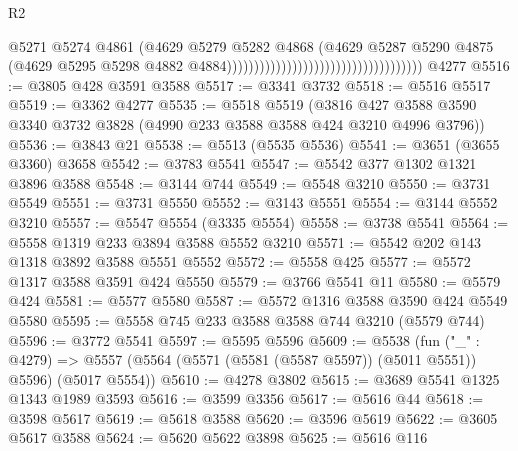 \begin{lexlean}{R2}
\begin{coremodule}
                                                                      @5271
                                                                      @5274
                                                                      @4861
                                                                      (@4629
                                                                        @5279
                                                                        @5282
                                                                        @4868
                                                                        (@4629
                                                                          @5287
                                                                          @5290
                                                                          @4875
                                                                          (@4629
                                                                            @5295
                                                                            @5298
                                                                            @4882
                                                                            @4884))))))))))))))))))))))))))))))))))))
    @4277
@5516 := @3805 @428 @3591 @3588
@5517 := @3341 @3732
@5518 := @5516 @5517
@5519 := @3362 @4277
@5535 := @5518
    @5519
    (@3816 @427 @3588 @3590 @3340 @3732 @3828 (@4990 @233 @3588 @3588 @424 @3210 @4996 @3796))
@5536 := @3843 @21
@5538 := @5513 (@5535 @5536)
@5541 := @3651 (@3655 @3360) @3658
@5542 := @3783 @5541
@5547 := @5542 @377 @1302 @1321 @3896 @3588
@5548 := @3144 @744
@5549 := @5548 @3210
@5550 := @3731 @5549
@5551 := @3731 @5550
@5552 := @3143 @5551
@5554 := @3144 @5552 @3210
@5557 := @5547 @5554 (@3335 @5554)
@5558 := @3738 @5541
@5564 := @5558 @1319 @233 @3894 @3588 @5552 @3210
@5571 := @5542 @202 @143 @1318 @3892 @3588 @5551 @5552
@5572 := @5558 @425
@5577 := @5572 @1317 @3588 @3591 @424 @5550
@5579 := @3766 @5541 @11
@5580 := @5579 @424
@5581 := @5577 @5580
@5587 := @5572 @1316 @3588 @3590 @424 @5549 @5580
@5595 := @5558 @745 @233 @3588 @3588 @744 @3210 (@5579 @744)
@5596 := @3772 @5541
@5597 := @5595 @5596
@5609 := @5538
    (fun ("_" : @4279) =>
    @5557 (@5564 (@5571 (@5581 (@5587 @5597)) (@5011 @5551)) @5596) (@5017 @5554))
@5610 := @4278 @3802
@5615 := @3689 @5541 @1325 @1343 @1989 @3593
@5616 := @3599 @3356
@5617 := @5616 @44
@5618 := @3598 @5617
@5619 := @5618 @3588
@5620 := @3596 @5619
@5622 := @3605 @5617 @3588
@5624 := @5620 @5622 @3898
@5625 := @5616 @116

\end{coremodule}
\end{lexlean}
